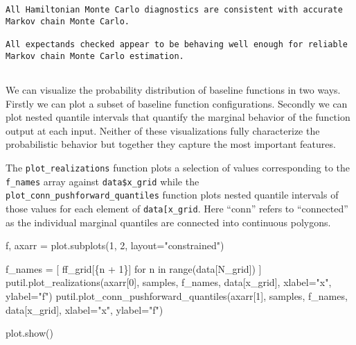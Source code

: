 \documentclass[
  letterpaper,
  DIV=11,
  numbers=noendperiod]{scrartcl}
\newenvironment{Shaded}{\begin{snugshade}}{\end{snugshade}}
\newcommand{\BuiltInTok}[1]{\textcolor[rgb]{0.00,0.23,0.31}{#1}}
\newcommand{\ControlFlowTok}[1]{\textcolor[rgb]{0.00,0.23,0.31}{#1}}
\newcommand{\DecValTok}[1]{\textcolor[rgb]{0.68,0.00,0.00}{#1}}
\newcommand{\KeywordTok}[1]{\textcolor[rgb]{0.00,0.23,0.31}{#1}}
\newcommand{\NormalTok}[1]{\textcolor[rgb]{0.00,0.23,0.31}{#1}}
\newcommand{\OperatorTok}[1]{\textcolor[rgb]{0.37,0.37,0.37}{#1}}
\newcommand{\SpecialCharTok}[1]{\textcolor[rgb]{0.37,0.37,0.37}{#1}}
\newcommand{\SpecialStringTok}[1]{\textcolor[rgb]{0.13,0.47,0.30}{#1}}
\newcommand{\StringTok}[1]{\textcolor[rgb]{0.13,0.47,0.30}{#1}}
\begin{document}
\begin{verbatim}
All Hamiltonian Monte Carlo diagnostics are consistent with accurate
Markov chain Monte Carlo.
 
All expectands checked appear to be behaving well enough for reliable
Markov chain Monte Carlo estimation.
 
\end{verbatim}

We can visualize the probability distribution of baseline functions in
two ways. Firstly we can plot a subset of baseline function
configurations. Secondly we can plot nested quantile intervals that
quantify the marginal behavior of the function output at each input.
Neither of these visualizations fully characterize the probabilistic
behavior but together they capture the most important features.

The \texttt{plot\_realizations} function plots a selection of values
corresponding to the \texttt{f\_names} array against
\texttt{data\$x\_grid} while the
\texttt{plot\_conn\_pushforward\_quantiles} function plots nested
quantile intervals of those values for each element of
\texttt{data{[}\textquotesingle{}x\_grid\textquotesingle{}{]}}. Here
``conn'' refers to ``connected'' as the individual marginal quantiles
are connected into continuous polygons.

\begin{Shaded}
\begin{Highlighting}[]
\NormalTok{f, axarr }\OperatorTok{=}\NormalTok{ plot.subplots(}\DecValTok{1}\NormalTok{, }\DecValTok{2}\NormalTok{, layout}\OperatorTok{=}\StringTok{"constrained"}\NormalTok{)}

\NormalTok{f\_names }\OperatorTok{=}\NormalTok{ [ }\SpecialStringTok{f\textquotesingle{}f\_grid[}\SpecialCharTok{\{}\NormalTok{n }\OperatorTok{+} \DecValTok{1}\SpecialCharTok{\}}\SpecialStringTok{]\textquotesingle{}} \ControlFlowTok{for}\NormalTok{ n }\KeywordTok{in} \BuiltInTok{range}\NormalTok{(data[}\StringTok{\textquotesingle{}N\_grid\textquotesingle{}}\NormalTok{]) ]}
\NormalTok{putil.plot\_realizations(axarr[}\DecValTok{0}\NormalTok{], samples, f\_names, data[}\StringTok{\textquotesingle{}x\_grid\textquotesingle{}}\NormalTok{],}
\NormalTok{                        xlabel}\OperatorTok{=}\StringTok{"x"}\NormalTok{, ylabel}\OperatorTok{=}\StringTok{"f"}\NormalTok{)}
\NormalTok{putil.plot\_conn\_pushforward\_quantiles(axarr[}\DecValTok{1}\NormalTok{], samples,}
\NormalTok{                                      f\_names, data[}\StringTok{\textquotesingle{}x\_grid\textquotesingle{}}\NormalTok{],}
\NormalTok{                                      xlabel}\OperatorTok{=}\StringTok{"x"}\NormalTok{, ylabel}\OperatorTok{=}\StringTok{"f"}\NormalTok{)}

\NormalTok{plot.show()}
\end{Highlighting}
\end{Shaded}
\end{document}
